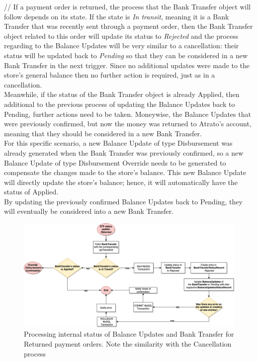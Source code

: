 //
If a payment order is returned, the process that the Bank Transfer object will follow depends on its state. If the state is \textit{In transit}, meaning it is a Bank Transfer that was recently sent through a payment order, then the Bank Transfer object related to this order will update its status to \textit{Rejected} and the process regarding to the Balance Updates will be very similar to a cancellation: their status will be updated back to \textit{Pending} so that they can be considered in a new Bank Transfer in the next trigger. Since no additional updates were made to the store’s general balance then no further action is required, just as in a cancellation.\\

Meanwhile, if the status of the Bank Transfer object is already Applied, then additional to the previous process of updating the Balance Updates back to Pending, further actions need to be taken. Moneywise, the Balance Updates that were previously confirmed, but now the money was returned to Atrato’s account, meaning that they should be considered in a new Bank Transfer.\\

For this specific scenario, a new Balance Update of type Disbursement was already generated when the Bank Transfer was previously confirmed, so a new Balance Update of type Disbursement Override needs to be generated to compensate the changes made to the store’s balance. This new Balance Update will directly update the store’s balance; hence, it will automatically have the status of Applied.\\

By updating the previously confirmed Balance Updates back to Pending, they will eventually be considered into a new Bank Transfer.

\begin{figure} [H]
    \centering
    \includegraphics[scale = 0.4]{assets/diagrams/ReturnedStatus.png}
    \caption{Processing internal status of Balance Updates and Bank Transfer for Returned payment orders. Note the similarity with the Cancellation process}\label{fig:returned_status_update}
\end{figure}

